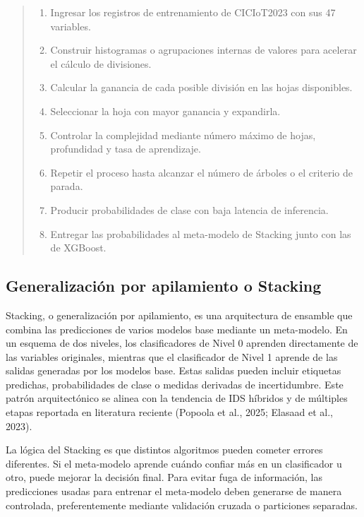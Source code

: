 \documentclass[12pt,a4paper]{article}
\begin{document}
\begin{quote}
\small
\begin{enumerate}
    \item Ingresar los registros de entrenamiento de CICIoT2023 con sus 47 variables.
    \item Construir histogramas o agrupaciones internas de valores para acelerar el cálculo de divisiones.
    \item Calcular la ganancia de cada posible división en las hojas disponibles.
    \item Seleccionar la hoja con mayor ganancia y expandirla.
    \item Controlar la complejidad mediante número máximo de hojas, profundidad y tasa de aprendizaje.
    \item Repetir el proceso hasta alcanzar el número de árboles o el criterio de parada.
    \item Producir probabilidades de clase con baja latencia de inferencia.
    \item Entregar las probabilidades al meta-modelo de Stacking junto con las de XGBoost.
\end{enumerate}
\end{quote}

\subsection{Generalización por apilamiento o Stacking}

Stacking, o generalización por apilamiento, es una arquitectura de ensamble que combina las predicciones de varios modelos base mediante un meta-modelo. En un esquema de dos niveles, los clasificadores de Nivel 0 aprenden directamente de las variables originales, mientras que el clasificador de Nivel 1 aprende de las salidas generadas por los modelos base. Estas salidas pueden incluir etiquetas predichas, probabilidades de clase o medidas derivadas de incertidumbre. Este patrón arquitectónico se alinea con la tendencia de IDS híbridos y de múltiples etapas reportada en literatura reciente (Popoola et al., 2025; Elasaad et al., 2023).

La lógica del Stacking es que distintos algoritmos pueden cometer errores diferentes. Si el meta-modelo aprende cuándo confiar más en un clasificador u otro, puede mejorar la decisión final. Para evitar fuga de información, las predicciones usadas para entrenar el meta-modelo deben generarse de manera controlada, preferentemente mediante validación cruzada o particiones separadas.
\end{document}
